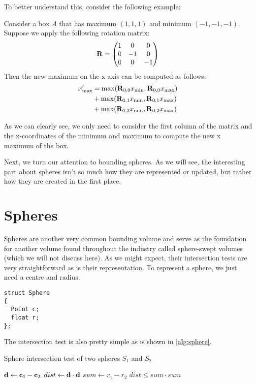    To better understand this, consider the following example:
    \begin{exmp}
      Consider a box $A$ that has maximum $(1, 1, 1)$ and minimum $(-1, -1,
      -1)$. Suppose we apply the following rotation matrix: 
      \[
        {\mathbf R} = 
        \begin{pmatrix}
          1 & 0 & 0 \\
          0 & -1 & 0 \\
          0 & 0 & -1
        \end{pmatrix}
      \]
      Then the new maximum on the x-axis can be computed as follows:
      \begin{align*}
        x'_{\max} &= \max({\mathbf R}_{0, 0}x_{\min}, {\mathbf R}_{0, 0}x_{\max}) \\
                  &+ \max({\mathbf R}_{0, 1}x_{\min}, {\mathbf R}_{0, 1}x_{\max}) \\ 
                  &+ \max({\mathbf R}_{0, 2}x_{\min}, {\mathbf R}_{0, 2}x_{\max}) \\ 
      \end{align*}
    \end{exmp}

    As we can clearly see, we only need to consider the first column of the
    matrix and the x-coordinates of the minimum and maximum to compute the new
    x maximum of the box.

    Next, we turn our attention to bounding spheres. As we will see, the
    interesting part about spheres isn't so much how they are represented or
    updated, but rather how they are created in the first place.

  \section{Spheres}
    Spheres are another very common bounding volume and serve as the foundation
    for another volume found throughout the industry called sphere-swept
    volumes (which we will not discuss here). As we might expect, their
    intersection tests are very straightforward as is their representation. To
    represent a sphere, we just need a centre and radius.
    \begin{lstlisting}[caption=Sphere representation, style=codestyle]
struct Sphere
{
  Point c;
  float r;
};
    \end{lstlisting}

    The intersection test is also pretty simple as is shown in \ref{alg:sphere}.
    \begin{algorithm}
      \caption{Sphere intersection test of two spheres $S_1$ and $S_2$}
      \label{alg:sphere}
      \begin{algorithmic}
        \State ${\mathbf d } \gets {\mathbf c }_1 - {\mathbf c }_2$
        \State $dist \gets {\mathbf d } \cdot {\mathbf d }$
        \State $sum \gets r_1 - r_2$
        \State \Return $dist \leq sum \cdot sum$
      \end{algorithmic}
    \end{algorithm}

